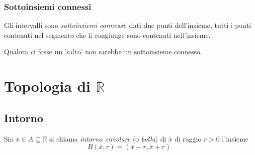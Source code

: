 \documentclass[a4paper,12pt, oneside]{book}
\begin{document}
\subsubsection{Sottoinsiemi connessi} Gli intervalli sono \textit{sottoinsiemi
  connessi}: dati due punti dell'insieme, tutti i punti contenuti nel segmento che
li congiunge sono contenuti nell'insieme.
\begin{osservazione} Qualora ci fosse un 'salto' non sarebbe un sottoinsieme
  connesso.
\end{osservazione}
\section{Topologia di $\mathbb{R}$}
\subsection{Intorno}
\begin{definizione} Sia $\overline{x} \in A \subseteq \mathbb{R}$ si chiama
  \emph{intorno circolare} (o \emph{bolla}) di $\overline{x}$ di raggio $r > 0$
  l'insieme
  \begin{equation} B(\overline{x},r)= (\overline{x} - r, \overline{x} + r)
  \end{equation}
\end{definizione}
\end{document}
